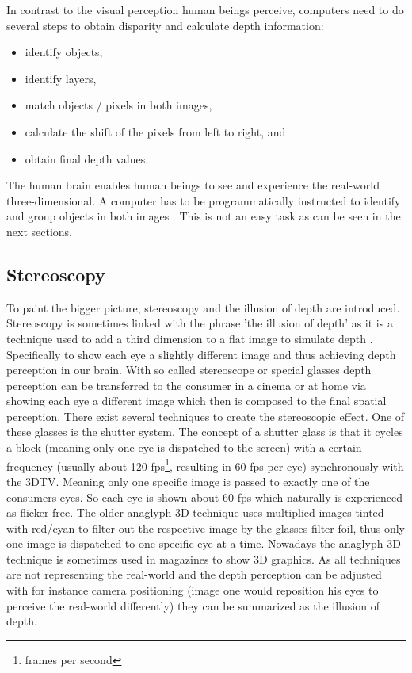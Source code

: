 \noindent In contrast to the visual perception human beings perceive, computers need to do several steps to obtain disparity and calculate depth information:

\begin{itemize}
  \item identify objects,
  \item identify layers,
  \item match objects / pixels in both images,
  \item calculate the shift of the pixels from left to right, and
  \item obtain final depth values.
\end{itemize}

\noindent The human brain enables human beings to see and experience the real-world three-dimensional.
A computer has to be programmatically instructed to identify and group objects in both images \citep{block20133d, cyganek2011introduction}.
This is not an easy task as can be seen in the next sections.

\subsection*{Stereoscopy}

To paint the bigger picture, stereoscopy and the illusion of depth are introduced.
Stereoscopy is sometimes linked with the phrase 'the illusion of depth' as it is a technique used to add a third dimension to a flat image to simulate depth \citep{block20133d, lucas20133d}.
Specifically to show each eye a slightly different image and thus achieving depth perception in our brain.
With so called stereoscope or special glasses depth perception can be transferred to the consumer in a cinema or at home via showing each eye a different image which then is composed to the final spatial perception.
\newline\newline\noindent There exist several techniques to create the stereoscopic effect. One of these glasses is the shutter system.
The concept of a shutter glass is that it cycles a block (meaning only one eye is dispatched to the screen) with a certain frequency (usually about 120 fps\footnote{frames per second}, resulting in 60 fps per eye) synchronously with the 3DTV.
Meaning only one specific image is passed to exactly one of the consumers eyes.
So each eye is shown about 60 fps which naturally is experienced as flicker-free.
The older anaglyph 3D technique uses multiplied images tinted with red/cyan to filter out the respective image by the glasses filter foil, thus only one image is dispatched to one specific eye at a time.
Nowadays the anaglyph 3D technique is sometimes used in magazines to show 3D graphics.
As all techniques are not representing the real-world and the depth perception can be adjusted with for instance camera positioning (image one would reposition his eyes to perceive the real-world differently) they can be summarized as the illusion of depth.

